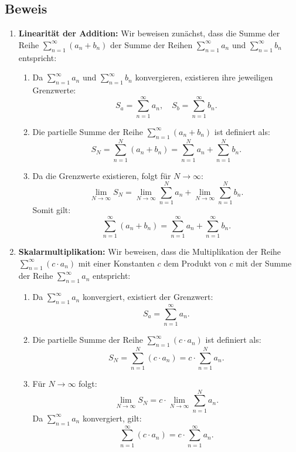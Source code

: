 \documentclass[11pt]{article}
\begin{document}
\subsection*{Beweis}
\begin{enumerate}
    \item \textbf{Linearität der Addition:} Wir beweisen zunächst, dass die Summe der Reihe \(\sum_{n=1}^\infty (a_n + b_n)\) der Summe der Reihen \(\sum_{n=1}^\infty a_n\) und \(\sum_{n=1}^\infty b_n\) entspricht:
    \begin{enumerate}
        \item Da \(\sum_{n=1}^\infty a_n\) und \(\sum_{n=1}^\infty b_n\) konvergieren, existieren ihre jeweiligen Grenzwerte:
        \[
        S_a = \sum_{n=1}^\infty a_n, \quad S_b = \sum_{n=1}^\infty b_n.
        \]
        \item Die partielle Summe der Reihe \(\sum_{n=1}^\infty (a_n + b_n)\) ist definiert als:
        \[
        S_N = \sum_{n=1}^N (a_n + b_n) = \sum_{n=1}^N a_n + \sum_{n=1}^N b_n.
        \]
        \item Da die Grenzwerte existieren, folgt für \(N \to \infty\):
        \[
        \lim_{N \to \infty} S_N = \lim_{N \to \infty} \sum_{n=1}^N a_n + \lim_{N \to \infty} \sum_{n=1}^N b_n.
        \]
        Somit gilt:
        \[
        \sum_{n=1}^\infty (a_n + b_n) = \sum_{n=1}^\infty a_n + \sum_{n=1}^\infty b_n.
        \]
    \end{enumerate}

    \item \textbf{Skalarmultiplikation:} Wir beweisen, dass die Multiplikation der Reihe \(\sum_{n=1}^\infty (c \cdot a_n)\) mit einer Konstanten \( c \) dem Produkt von \( c \) mit der Summe der Reihe \(\sum_{n=1}^\infty a_n\) entspricht:
    \begin{enumerate}
        \item Da \(\sum_{n=1}^\infty a_n\) konvergiert, existiert der Grenzwert:
        \[
        S_a = \sum_{n=1}^\infty a_n.
        \]
        \item Die partielle Summe der Reihe \(\sum_{n=1}^\infty (c \cdot a_n)\) ist definiert als:
        \[
        S_N = \sum_{n=1}^N (c \cdot a_n) = c \cdot \sum_{n=1}^N a_n.
        \]
        \item Für \(N \to \infty\) folgt:
        \[
        \lim_{N \to \infty} S_N = c \cdot \lim_{N \to \infty} \sum_{n=1}^N a_n.
        \]
        Da \(\sum_{n=1}^\infty a_n\) konvergiert, gilt:
        \[
        \sum_{n=1}^\infty (c \cdot a_n) = c \cdot \sum_{n=1}^\infty a_n.
        \]
    \end{enumerate}
\end{enumerate}
\end{document}
